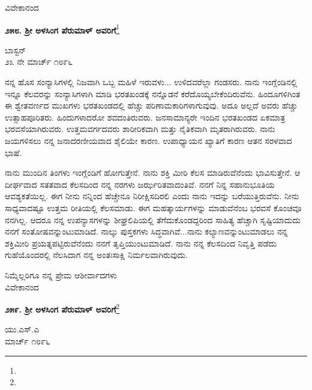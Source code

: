 \vspace{-0.35cm}

{\flushright
ವಿವೇಕಾನಂದ\par}

\begin{center}
\textbf{೨೫೮. ಶ‍್ರೀ ಅಳಸಿಂಗ ಪೆರುಮಾಳ್ ಅವರಿಗೆ}\footnote{}
\end{center}

\vspace{-0.55cm}

\begin{flushright}
ಬಾಸ್ಟನ್\\೨೩ ನೇ ಮಾರ್ಚ್ ೧೮೯೬
\end{flushright}

ನನ್ನ ಹೊಸ ಸಂನ್ಯಾಸಿಗಳಲ್ಲಿ ನಿಜವಾಗಿ ಒಬ್ಬ ಮಹಿಳೆ ಇರುವಳು... ಉಳಿದವರೆಲ್ಲಾ ಗಂಡಸರು. ನಾನು ಇಂಗ್ಲೆಂಡಿನಲ್ಲಿ ಇನ್ನೂ ಕೆಲವರನ್ನು ಸಂನ್ಯಾಸಿಗಳಾಗಿ ಮಾಡಿ ಭರತಖಂಡಕ್ಕೆ ನನ್ನೊಡನೆ ಕರೆದೊಯ್ಯಬೇಕೆಂದಿರುವೆನು. ಹಿಂದೂಗಳಿಗಿಂತ ಈ ಶ್ವೇತವರ್ಣದ ಮುಖಗಳು ಭರತಖಂಡದಲ್ಲಿ ಹೆಚ್ಚು ಪರಿಣಾಮಕಾರಿಗಳಾಗುವುವು. ಅದೂ ಅಲ್ಲದೆ ಅವರು ಹೆಚ್ಚು ಉತ್ಸಾಹಪೂರಿತರು. ಹಿಂದುಗಳಾದರೋ ಶವದಂತಿರುವರು. ಜನಸಾಮಾನ್ಯರೇ ಇಂದಿನ ಭರತಖಂಡದ ಏಕಮಾತ್ರ ಭರವಸೆಯಾಗಿರುವರು. ಉತ್ತಮವರ್ಗದವರು ಶಾರೀರಿಕವಾಗಿ ಮತ್ತು ನೈತಿಕವಾಗಿ ಮೃತರಾಗಿರುವರು. ನಾನು ಜಯಗಳಿಸಲು ನನ್ನ ಜನಾದರಣೀಯವಾದ ಶೈಲಿಯೇ ಕಾರಣ. ಉಪಾಧ್ಯಾಯನ ಖ್ಯಾತಿಗೆ ಕಾರಣ ಆತನ ಸರಳವಾದ ಭಾಷೆ.

ನಾನು ಮುಂದಿನ ತಿಂಗಳು ಇಂಗ್ಲೆಂಡಿಗೆ ಹೋಗುತ್ತೇನೆ. ನಾನು ಶಕ್ತಿ ಮೀರಿ ಕೆಲಸ ಮಾಡಿರುವೆನೆಂದು ಭಾವಿಸುತ್ತೇನೆ. ಆ ದೀರ್ಘವಾದ ಸತತವಾದ ಕೆಲಸದಿಂದ ನನ್ನ ನರಗಳು ಜರ್ಝರಿತವಾದಂತಿವೆ. ನನಗೆ ನಿನ್ನ ಸಹಾನುಭೂತಿಯ ಆವಶ್ಯಕತೆಯಿಲ್ಲ. ಈಗ ನೀನು ನನ್ನಿಂದ ಹೆಚ್ಚೇನೂ ನಿರೀಕ್ಷಿಸದಿರಲಿ ಎಂದು ನಾನು ಇದನ್ನು ಬರೆಯುತ್ತಿರುವೆನು. ನೀನು ಸಾಧ್ಯವಾದಷ್ಟೂ ಉತ್ತಮ ರೀತಿಯಲ್ಲಿ ಕೆಲಸಮಾಡು. ಈಗ ಮಹತ್ಕಾರ್ಯಗಳನ್ನು ಮಾಡುವೆನೆಂಬ ಭರವಸೆ ಕೊಂಚವೂ ನನಗಿಲ್ಲ. ಆದರೂ ನನ್ನ ಉಪನ್ಯಾಸಗಳನ್ನು ಶೀಘ್ರಲಿಪಿಯಲ್ಲಿ ತೆಗೆದುಕೊಂಡದ್ದರಿಂದ ಸಾಹಿತ್ಯ ಹೆಚ್ಚಾಗಿ ಸೃಷ್ಟಿಯಾದುದು ನನಗೆ ಸಂತೋಷವನ್ನುಂಟುಮಾಡಿದೆ. ನಾಲ್ಕು ಪುಸ್ತಕಗಳು ಸಿದ್ಧವಾಗಿವೆ...ನಾನು ಕಲ್ಯಾಣವನ್ನುಂಟುಮಾಡಲು ನನ್ನ ಶಕ್ತಿಮೀರಿ ಪ್ರಯತ್ನಪಟ್ಟಿರುವೆನೆಂದು ನನಗೆ ತೃಪ್ತಿಯುಂಟುಮಾಡಿದೆ. ನಾನು ನನ್ನ ಕೆಲಸದಿಂದ ನಿವೃತ್ತಿ ಪಡೆದು ಗುಹೆಯೊಂದರಲ್ಲಿ ನೆಲಸಿದಾಗ ನನ್ನ ಅಂತಃಸಾಕ್ಷಿ ನಿರ್ಮಲವಾಗಿರುವುದು.

{\flushright
ನಿಮ್ಮೆಲ್ಲರಿಗೂ ನನ್ನ ಪ್ರೇಮ ಆಶೀರ್ವಾದಗಳು\\ವಿವೇಕಾನಂದ\par}

\begin{center}
\textbf{೨೫೯. ಶ‍್ರೀ ಅಳಸಿಂಗ ಪೆರುಮಾಳ್ ಅವರಿಗೆ}\footnote{}
\end{center}

\begin{flushright}
ಯು.ಎಸ್.ಎ\\ಮಾರ್ಚ್ ೧೮೯೬
\end{flushright}

